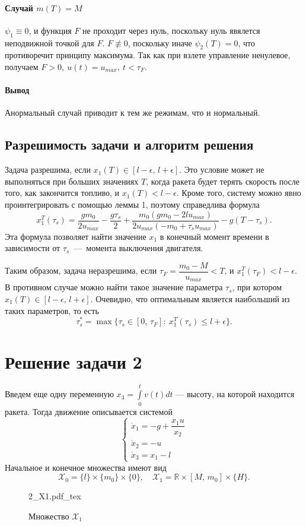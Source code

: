 \documentclass[16pt]{article}
\newcommand{\incfig}[2]{%
    \def\svgwidth{#2 mm}
    {#1.pdf_tex}
}
\newcommand\Real{\mathbb{R}}
\newcommand\Int[2]{\int\limits_{#1}^{#2}}
\newcommand\X{\mathcal{X}}
\newcommand\Pict[3]{
\begin{figure}[h!]
    \centering
    \incfig{#1}{#3}
    \caption{#2}
    \label{fig:#1}
\end{figure}
}
\begin{document}
\paragraph{Случай $m(T) = M$} $\psi_1 \equiv 0$, и функция $F$ не проходит через нуль,
поскольку нуль явялется неподвижной точкой для $F$. $F \not\equiv 0$, поскольку иначе $\psi_2(T) = 0$, что 
противоречит принципу максимума. Так как при взлете управление ненулевое, получаем $F > 0, \ u(t) = u_{max},
\ t < \tau_F.$
\paragraph{Вывод}
Анормальный случай приводит к тем же режимам, что и нормальный.
\subsection{Разрешимость задачи и алгоритм решения}
Задача разрешима, если $x_1(T) \in [l - \epsilon,\, l + \epsilon]$. Это условие может не выполняться при больших 
значениях $T$, когда ракета будет терять скорость после того, как закончится топливо, и $x_1(T) < l - \epsilon$.
Кроме того, систему можно явно проинтегрировать с помощью леммы 1, поэтому справедлива формула
$$x_{1}^T(\tau_s) = \dfrac{gm_0}{2u_{max}} - \dfrac{g\tau_s}{2} +
 \dfrac{m_0(gm_0 - 2lu_{max})}{2u_{max}(-m_0 + \tau_su_{max})} - g(T - \tau_s).$$
Эта формула позволяет найти значение $x_1$ в конечный момент времени в зависимости от
$\tau_s$~---~момента выключения двигателя.

Таким образом, задача неразрешима, если $\tau_F = \dfrac{m_0 - M}{u_{max}} < T$, и
$x_{1}^T(\tau_F) < l - \epsilon$. В противном случае можно найти такое значение параметра $\tau_s$, при котором
$x_1(T) \in [l - \epsilon,\,l+\epsilon].$ Очевидно, что оптимальным является наибольший из таких параметров, то есть
$$\tau_s^* = \max\{\tau_s \in [0,\, \tau_F]\colon\  x_1^T(\tau_s) \leqslant l + \epsilon\}.$$

\section{Решение задачи 2}
Введем еще одну переменную $x_3 = \Int{0}{t}v(t)dt$ --- высоту, на которой находится ракета.
 Тогда движение описывается системой
\begin{equation}
\begin{cases} \label{rocket_ode2}
\dot{x}_1 = -g + \dfrac{x_1u}{x_2} \\
\dot{x}_2 = -u \\
\dot{x}_3 = x_1 - l
\end{cases} 
\end{equation}
Начальное и конечное множества имеют вид
$$\X_0 =\{l\}\times\{m_0\}\times\{0\}, \quad \X_1 = \Real \times [M,\,m_0] \times \{H\}.$$
\Pict{2_X1}{Множество $\X_1$}{90}
\end{document}
